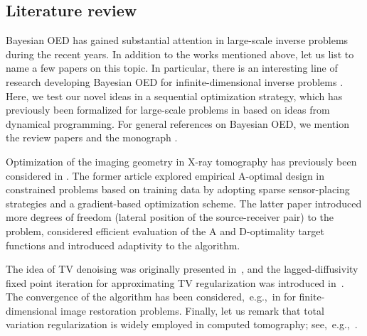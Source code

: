 \documentclass[final]{siamltex}
\begin{document}
\subsection{Literature review}
Bayesian OED has gained substantial attention in large-scale inverse problems during the recent years. In addition to the works mentioned above, let us list \cite{alexanderian2018efficient, attia2018goal, fohring2016adaptive, haber2008numerical, haber2009numerical, haber2012numerical, hyvonen2014eit, khodja2010guided,long2015fast,long2013fast, aretz2020sequential} to name a few papers on this topic. In particular, there is an interesting line of research developing Bayesian OED for infinite-dimensional inverse problems \cite{alexanderian2014optimal, alexanderian2016bayesian, alexanderian2016fast, alexanderian2021optimal}. Here, we test our novel ideas in a sequential optimization strategy, which has previously been formalized for large-scale problems in \cite{huan2016sequential} based on ideas from dynamical programming. For general references on Bayesian OED, we mention the review papers \cite{chaloner1995bayesian, ryan2016review} and the monograph \cite{pukelsheim2006optimal}.

Optimization of the imaging geometry in X-ray tomography has previously been considered in \cite{ruthotto2017optimal,Burger21}. The former article explored empirical A-optimal design in constrained problems based on training data by adopting sparse sensor-placing strategies and a gradient-based optimization scheme.  The latter paper \cite{Burger21} introduced more degrees of freedom (lateral position of the source-receiver pair) to the problem, considered efficient evaluation of the A and D-optimality target functions and introduced adaptivity to the algorithm.

The idea of TV denoising was originally presented in~\cite{Rudin92}, and the lagged-diffusivity fixed point iteration for approximating TV regularization was introduced in~\cite{Vogel96}. The convergence of the algorithm has been considered,~e.g.,~in \cite{dobson1997convergence,chan1999convergence} for finite-dimensional image restoration problems. Finally, let us remark that total variation regularization is widely employed in computed tomography; see,~e.g.,~\cite{sidky2008image,liu2012adaptive,tian2011low}.
\end{document}
